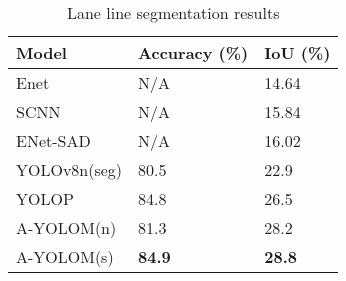 \documentclass[lettersize,journal]{IEEEtran}
\begin{document}
\begin{table}[h]
    \centering
    \caption{Lane line segmentation results}
    \label{tab:ll_results}
    \begin{tabularx}{\linewidth}{YYY}
        \toprule
        Model & Accuracy (\%) & IoU (\%) \\
        \midrule
        Enet & N/A & 14.64 \\
        SCNN & N/A & 15.84 \\
        ENet-SAD & N/A & 16.02 \\
        YOLOv8n(seg) & 80.5 & 22.9 \\
        YOLOP & 84.8 & 26.5 \\
        A-YOLOM(n) & 81.3 & 28.2 \\
        A-YOLOM(s) & \textbf{84.9} & \textbf{28.8} \\
        \bottomrule
    \end{tabularx}
\end{table}
\end{document}
